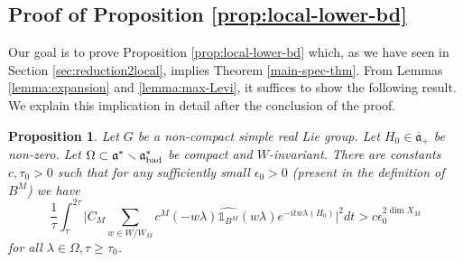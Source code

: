 \documentclass[12pt]{amsart}
\newtheorem{prop}[theorem]{Proposition}
\theoremstyle{remark}
\newcommand{\ga}{\mathfrak a}
\begin{document}
\subsection{Proof of Proposition \ref{prop:local-lower-bd}}\label{sec:spectral-proof}

Our goal is to prove Proposition \ref{prop:local-lower-bd} which, as we have seen in Section \ref{sec:reduction2local}, implies Theorem \ref{main-spec-thm}. From Lemmas \ref{lemma:expansion} and \ref{lemma:max-Levi}, it suffices to show the following result. We explain this implication in detail after the conclusion of the proof. 
\begin{prop}\label{prop:int-W-sum}
Let $G$ be a non-compact simple real Lie group. Let $H_0\in\overline{\ga}_+$ be non-zero. Let $\Omega\subset \ga^*\smallsetminus  \ga_{\rm bad}^*$ be compact and $W$-invariant.  There are constants $c,\tau_0>0$ such that for any sufficiently small $\epsilon_0>0$ (present in the definition of $B^M$) we have
\[
 \frac{1}{\tau} \int_{\tau}^{2\tau} \Big| C_M  \sum_{w \in W /  W_M} c^M(-w\lambda)\widehat{\mathds{1}_{B^M}}(w\lambda)e^{-it w\lambda(H_0)} \Big|^2 dt > c \epsilon_0^{2 \dim X_M}
\]
for all $\lambda \in \Omega, \tau \geq \tau_0$.
\end{prop}
\end{document}
